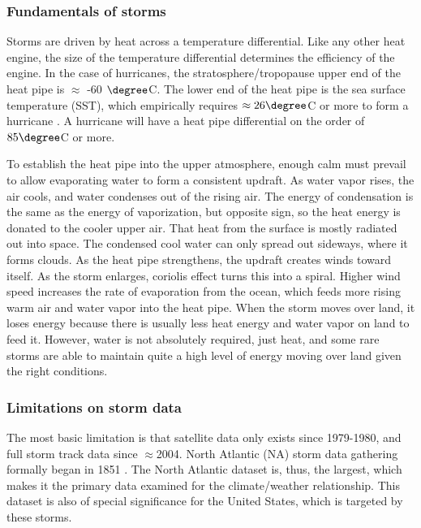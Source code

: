 \documentclass{article}
\begin{document}
\subsubsection{Fundamentals of storms}
Storms are driven by heat across a temperature differential. Like any other heat engine, the size of the temperature differential determines the efficiency of the engine. In the case of hurricanes, the stratosphere/tropopause upper end of the heat pipe is $\approx$ -60 $\degree$C. The lower end of the heat pipe is the sea surface temperature (SST), which empirically requires $\approx 26 \degree$C or more  to form a hurricane \cite[p 591]{Emanuel1986AnAirSeaInteractionTheoryforTropicalCyclonesPartISteadyStateMaintenance}. A hurricane will have a heat pipe differential on the order of $85 \degree$C or more. 

To establish the heat pipe into the upper atmosphere, enough calm must prevail to allow evaporating water to form a consistent updraft. As water vapor rises, the air cools, and water condenses out of the rising air. The energy of condensation is the same as the energy of vaporization, but opposite sign, so the heat energy is donated to the cooler upper air. That heat from the surface is mostly radiated out into space. The condensed cool water can only spread out sideways, where it forms clouds. As the heat pipe strengthens, the updraft creates winds toward itself. As the storm enlarges, coriolis effect turns this into a spiral. Higher wind speed increases the rate of evaporation from the ocean, which feeds more rising warm air and water vapor into the heat pipe. When the storm moves over land, it loses energy because there is usually less heat energy and water vapor on land to feed it. However, water is not absolutely required, just heat, and some rare storms are able to maintain quite a high level of energy moving over land given the right conditions. 

\subsubsection{Limitations on storm data}

The most basic limitation is that satellite data only exists since 1979-1980, and full storm track data since $\approx$2004. North Atlantic (NA) storm data gathering formally began in 1851 \cite{Klotzbach2022EmailDatasetAnalysis}. The North Atlantic dataset is, thus, the largest, which makes it the primary data examined for the climate/weather relationship. This dataset is also of special significance for the United States, which is targeted by these storms.
\end{document}
